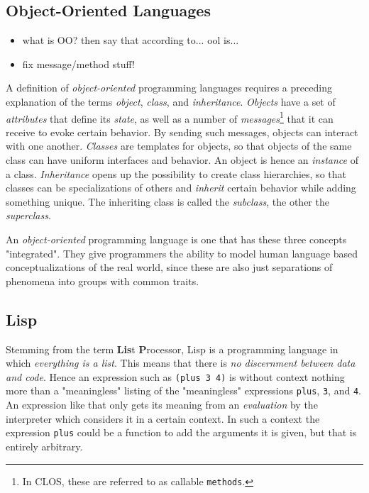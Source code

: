 \documentclass[oribibl]{llncs}
\begin{document}
\subsection{Object-Oriented Languages}
\label{sec:oo}

\begin{itemize}
\item what is OO? then say that according to... ool is...
\item fix message/method stuff!
\end{itemize}


A definition of \emph{object-oriented} programming languages requires a preceding explanation of the terms \emph{object}, \emph{class}, and \emph{inheritance}. \emph{Objects} have a set of \emph{attributes} that define its \emph{state}, as well as a number of \emph{messages}\footnote{In CLOS, these are referred to as callable \texttt{methods}.} that it can receive to evoke certain behavior. By sending such messages, objects can interact with one another. \emph{Classes} are templates for objects, so that objects of the same class can have uniform interfaces and behavior. An object is hence an \emph{instance} of a class. \emph{Inheritance} opens up the possibility to create class hierarchies, so that classes can be specializations of others and \emph{inherit} certain behavior while adding something unique. The inheriting class is called the \emph{subclass}, the other the \emph{superclass}.

An \emph{object-oriented} programming language is one that has these three concepts "integrated". They give programmers the ability to model human language based conceptualizations of the real world, since these are also just separations of phenomena into groups with common traits.

\subsection{Lisp}
\label{sec:lisp}

Stemming from the term \textbf{Lis}t \textbf{P}rocessor, Lisp is a programming language in which \emph{everything is a list}. This means that there is \emph{no discernment between data and code}. Hence an expression such as \texttt{(plus 3 4)} is without context nothing more than a "meaningless" listing of the "meaningless" expressions \texttt{plus}, \texttt{3}, and \texttt{4}. An expression like that only gets its meaning from an \emph{evaluation} by the interpreter which considers it in a certain context. In such a context the expression \texttt{plus} could be a function to add the arguments it is given, but that is entirely arbitrary. 
\end{document}
